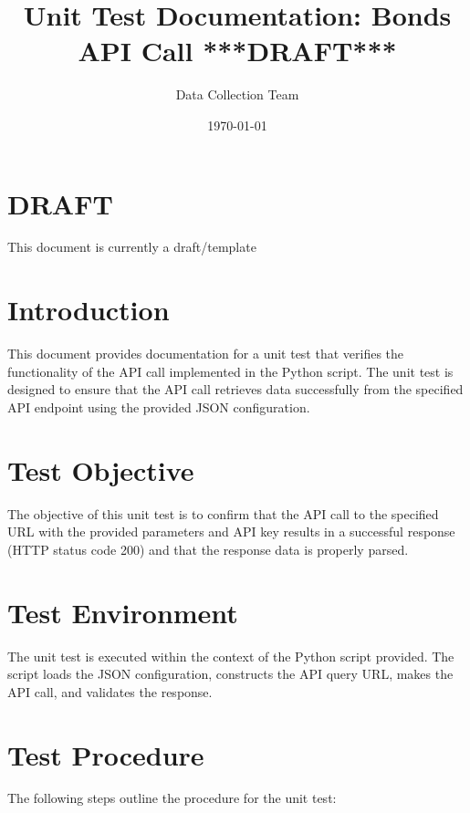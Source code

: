 \documentclass{article}
\title{Unit Test Documentation: Bonds API Call ***DRAFT***}
\author{Data Collection Team}
\date{\today}
\begin{document}
\maketitle

\section{DRAFT}
This document is currently a draft/template

\section{Introduction}
This document provides documentation for a unit test that verifies the functionality of the API call implemented in the Python script. The unit test is designed to ensure that the API call retrieves data successfully from the specified API endpoint using the provided JSON configuration.

\section{Test Objective}
The objective of this unit test is to confirm that the API call to the specified URL with the provided parameters and API key results in a successful response (HTTP status code 200) and that the response data is properly parsed.

\section{Test Environment}
The unit test is executed within the context of the Python script provided. The script loads the JSON configuration, constructs the API query URL, makes the API call, and validates the response.

\section{Test Procedure}
The following steps outline the procedure for the unit test:
\end{document}

